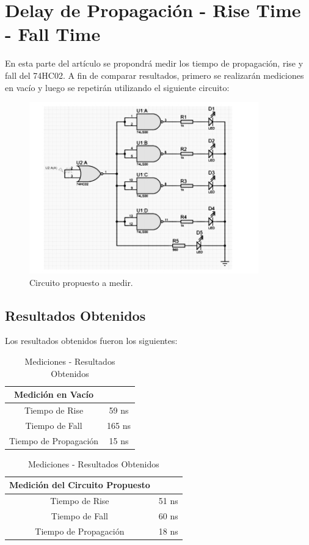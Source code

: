\section{Delay de Propagación - Rise Time - Fall Time}

En esta parte del artículo se propondrá medir los tiempo de propagación,
rise y fall del 74HC02. A fin de comparar resultados, primero se realizarán
mediciones en vacío y luego se repetirán utilizando el siguiente circuito:

\begin{figure}[H]
\begin{centering}
\includegraphics[scale=0.6]{circuitoAmedir.PNG}
\par\end{centering}
\begin{centering}
\caption{Circuito propuesto a medir.}
\par\end{centering}
\end{figure}


\subsection{Resultados Obtenidos}

Los resultados obtenidos fueron los siguientes:

\begin{table}[H]
\centering
\begin{tabular}{|c|c|}
\hline 
Medición en Vacío & \tabularnewline
\hline 
\hline 
Tiempo de Rise & 59 ns\tabularnewline
\hline 
Tiempo de Fall & 165 ns\tabularnewline
\hline 
Tiempo de Propagación & 15 ns\tabularnewline
\hline 
\end{tabular}\qquad
\begin{tabular}{|c|c|}
\hline 
Medición del Circuito Propuesto & \tabularnewline
\hline 
\hline 
Tiempo de Rise & 51 ns\tabularnewline
\hline 
Tiempo de Fall & 60 ns\tabularnewline
\hline 
Tiempo de Propagación & 18 ns\tabularnewline
\hline 
\end{tabular}

\caption{Mediciones - Resultados Obtenidos}

\end{table}

